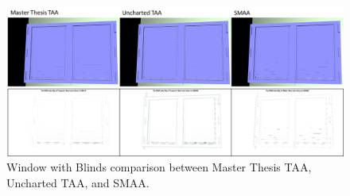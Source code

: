 \documentclass{cslthse-msc}
\begin{document}
\begin{figure}[H]
	\centering
	\includegraphics[scale=0.8]{images/results/window_blind.png}
	\caption{Window with Blinds comparison between Master Thesis TAA, Uncharted TAA, and SMAA.}\label{fig:window_blind_render}
\end{figure}
\end{document}
